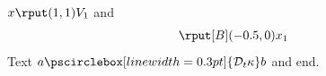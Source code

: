 \documentclass{article}
\begin{document}
$x \rput(1,1){V_1}$ and \[ \begin{array}{l} \rput[B](-0.5,0){x_1} \end{array} \]
Text $a\pscirclebox[linewidth=0.3pt]{\mathcal{D}_t\kappa} b$ and  end.
\end{document}
